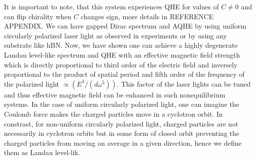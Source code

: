 It is important to note, that this system experiences QHE for values of $C\neq0$ and can flip chirality when $C$ changes sign, more details in REFERENCE APPENDIX.
We can have gapped Dirac spectrum and AQHE by using uniform circularly polarized laser light as observed in experiments \cite{YHW, JWM} or by using any substrate like hBN.
Now, we have shown one can achieve a highly degenerate Landau level-like spectrum and QHE with an effective magnetic field strength which is directly proportional to third order of the electric field and inversely proportional to the product of spatial period and fifth order of the frequency of the polarized light $\propto (E^3/(d\omega^5))$.
This factor of the laser lights can be tuned and thus effective magnetic field can be enhanced in such nonequilibrium systems.
In the case of uniform circularly polarized light, one can imagine the Coulomb force makes the charged particles move in a cyclotron orbit.
In constrast, for non-uniform circularly polarized light, charged particles are not necessarily in cyclotron orbits but in some form of closed orbit preventing the charged particles from moving on average in a given direction, hence we define them as Landau level-lik.
